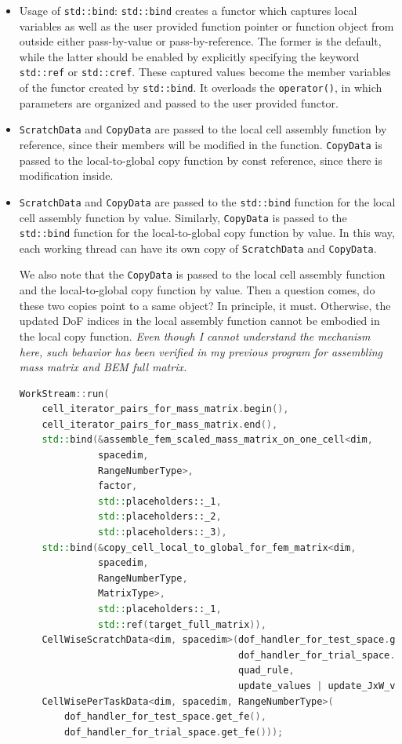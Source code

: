 \documentclass[11pt, a4paper]{article}
\begin{document}
\begin{itemize}
\item Usage of \texttt{std::bind}: \texttt{std::bind} creates a functor which captures local variables as well as the user provided function pointer or function object from outside either pass-by-value or pass-by-reference. The former is the default, while the latter should be enabled by explicitly specifying the keyword \texttt{std::ref} or \texttt{std::cref}. These captured values become the member variables of the functor created by \texttt{std::bind}. It overloads the \texttt{operator()}, in which parameters are organized and passed to the user provided functor.
\item \texttt{ScratchData} and \texttt{CopyData} are passed to the local cell assembly function by reference, since their members will be modified in the function. \texttt{CopyData} is passed to the local-to-global copy function by const reference, since there is modification inside.
\item \texttt{ScratchData} and \texttt{CopyData} are passed to the \texttt{std::bind} function for the local cell assembly function by value. Similarly, \texttt{CopyData} is passed to the \texttt{std::bind} function for the local-to-global copy function by value. In this way, each working thread can have its own copy of \texttt{ScratchData} and \texttt{CopyData}.

We also note that the \texttt{CopyData} is passed to the local cell assembly function and the local-to-global copy function by value. Then a question comes, do these two copies point to a same object? In principle, it must. Otherwise, the updated DoF indices in the local assembly function cannot be embodied in the local copy function. \emph{Even though I cannot understand the mechanism here, such behavior has been verified in my previous program for assembling mass matrix and BEM full matrix.}
\begin{lstlisting}[language=C++]
WorkStream::run(
    cell_iterator_pairs_for_mass_matrix.begin(),
    cell_iterator_pairs_for_mass_matrix.end(),
    std::bind(&assemble_fem_scaled_mass_matrix_on_one_cell<dim,
              spacedim,
              RangeNumberType>,
              factor,
              std::placeholders::_1,
              std::placeholders::_2,
              std::placeholders::_3),
    std::bind(&copy_cell_local_to_global_for_fem_matrix<dim,
              spacedim,
              RangeNumberType,
              MatrixType>,
              std::placeholders::_1,
              std::ref(target_full_matrix)),
    CellWiseScratchData<dim, spacedim>(dof_handler_for_test_space.get_fe(),
                                       dof_handler_for_trial_space.get_fe(),
                                       quad_rule,
                                       update_values | update_JxW_values),
    CellWisePerTaskData<dim, spacedim, RangeNumberType>(
        dof_handler_for_test_space.get_fe(),
        dof_handler_for_trial_space.get_fe()));
\end{lstlisting}
\end{itemize}
\end{document}
